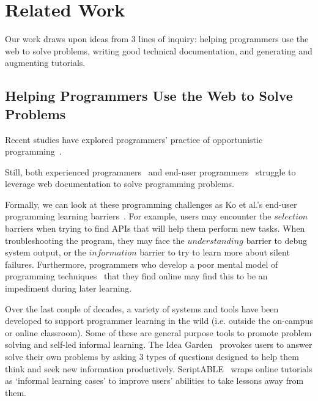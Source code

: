 \section{Related Work}


Our work draws upon ideas from 3 lines of inquiry:
helping programmers use the web to solve problems,
writing good technical documentation,
and generating and augmenting tutorials.

\subsection{Helping Programmers Use the Web to Solve Problems}

Recent studies have explored programmers' practice of opportunistic programming~\cite{brandt_two_2009}\cite{brandt_example-centric_2010}\cite{hartmann_hacking_2008}.

Still, both experienced programmers~\cite{duala-ekoko_asking_2012} and end-user programmers~\cite{dorn_lost_2013}\cite{dorn_learning_2010}\cite{rosson_everyday_2004} struggle to leverage web documentation to solve programming problems.

Formally, we can look at these programming challenges as Ko et al.'s end-user programming learning barriers~\cite{ko_six_2004}.
For example, users may encounter the $selection$ barriers when trying to find APIs that will help them perform new tasks.
When troubleshooting the program, they may face the $understanding$ barrier to debug system output, or the $information$ barrier to try to learn more about silent failures.
Furthermore, programmers who develop a poor mental model of programming techniques~\cite{winslow_programming_1996} that they find online may find this to be an impediment during later learning.

Over the last couple of decades, a variety of systems and tools have been developed to support programmer learning in the wild
(i.e. outside the on-campus or online classroom).
Some of these are general purpose tools to promote problem solving and self-led informal learning.
The Idea Garden~\cite{cao_barriers_2012}\cite{cao_end-user_2013} provokes users to answer solve their own problems by asking 3 types of questions designed to help them think and seek new information productively.
ScriptABLE~\cite{dorn_scriptable_2011} wraps online tutorials as `informal learning cases' to improve users' abilities to take lessons away from them. 

